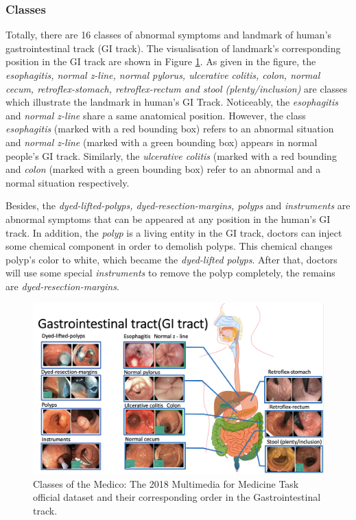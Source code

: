\subsubsection*{Classes}
Totally, there are 16 classes of abnormal symptoms and landmark of human's gastrointestinal track (GI track). The visualisation of landmark's corresponding position in the GI track are shown in Figure \ref{fig:vis_16_classes}. As given  in the figure, the \textit{esophagitis, normal z-line, normal  pylorus, ulcerative colitis, colon, normal cecum, retroflex-stomach, retroflex-rectum and stool (plenty/inclusion)} are classes which illustrate the landmark in human's GI Track. Noticeably, the \textit{esophagitis} and \textit{normal z-line} share a same anatomical position. However, the class \textit{esophagitis} (marked with a red bounding box) refers to an  abnormal situation and \textit{normal z-line} (marked with a green bounding box) appears in normal people's GI track. Similarly, the \textit{ulcerative colitis} (marked with a red bounding and \textit{colon} (marked with a green bounding box)  refer to an abnormal and a normal situation respectively.

Besides, the \textit{dyed-lifted-polyps, dyed-resection-margins, polyps} and \textit{instruments} are abnormal symptoms that can be appeared at any position in the human's GI track. In addition, the \textit{polyp} is a  living entity in the GI track, doctors can inject some chemical component in order to demolish polyps. This chemical changes polyp's color to white, which became the \textit{dyed-lifted polyps}. After that, doctors will use some special \textit{instruments} to remove the polyp completely, the remains are \textit{dyed-resection-margins}. 

\begin{figure}[thb]
\begin{center}
\includegraphics[width=\textwidth]{endoscopy_resources/vis_16_classes.png}
\end{center}
   \caption{Classes of the Medico: The 2018 Multimedia for Medicine Task official dataset and their corresponding order in the Gastrointestinal track.}
\label{fig:vis_16_classes}
\end{figure}


